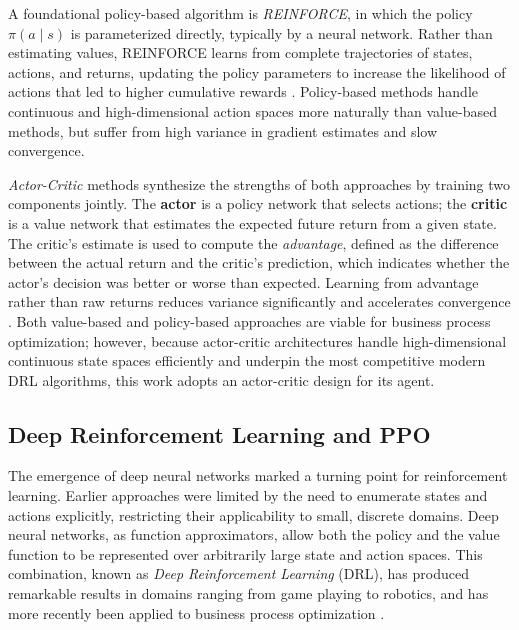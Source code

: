 \documentclass[journal,onecolumn]{IEEEtran}
\begin{document}
A foundational policy-based algorithm is \emph{REINFORCE}, in which the
policy $\pi(a \mid s)$ is parameterized directly, typically by a neural
network. Rather than estimating values, REINFORCE learns from complete
trajectories of states, actions, and returns, updating the policy parameters
to increase the likelihood of actions that led to higher cumulative rewards
\cite{sutton_2018_rl_intro}. Policy-based methods handle continuous and
high-dimensional action spaces more naturally than value-based methods, but
suffer from high variance in gradient estimates and slow convergence.

\emph{Actor-Critic} methods synthesize the strengths of both approaches by
training two components jointly. The \textbf{actor} is a policy network that
selects actions; the \textbf{critic} is a value network that estimates the
expected future return from a given state. The critic's estimate is used to
compute the \emph{advantage}, defined as the difference between the actual
return and the critic's prediction, which indicates whether the actor's
decision was better or worse than expected. Learning from advantage rather
than raw returns reduces variance significantly and accelerates convergence
\cite{lapan_2024_drll_handson}. Both value-based and policy-based approaches
are viable for business process optimization; however, because actor-critic
architectures handle high-dimensional continuous state spaces efficiently and
underpin the most competitive modern DRL algorithms, this work adopts an
actor-critic design for its agent.

\subsection{Deep Reinforcement Learning and PPO}
\label{subsec:drl}

The emergence of deep neural networks marked a turning point for
reinforcement learning. Earlier approaches were limited by the need to
enumerate states and actions explicitly, restricting their applicability to
small, discrete domains. Deep neural networks, as function approximators,
allow both the policy and the value function to be represented over
arbitrarily large state and action spaces. This combination, known as
\emph{Deep Reinforcement Learning} (DRL), has produced remarkable results
in domains ranging from game playing to robotics, and has more recently been
applied to business process optimization
\cite{Optimizing_Resource_Allocation_Policies, Learning_policies_drl}.
\end{document}
